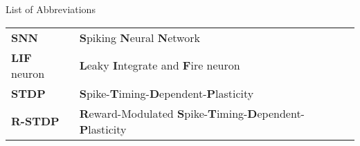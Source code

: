 \clearemptydoublepage

{}

\begin{center}
	\huge{List of Abbreviations}
\end{center}


\vspace{3cm}

\begin{center}
\begin{tabular}{l p{12cm}}
	\textbf{SNN} & \textbf{S}piking \textbf{N}eural \textbf{N}etwork\\
	\textbf{LIF} neuron & \textbf{L}eaky \textbf{I}ntegrate and \textbf{F}ire neuron\\
	\textbf{STDP} & \textbf{S}pike-\textbf{T}iming-\textbf{D}ependent-\textbf{P}lasticity\\
	\textbf{R-STDP} &  \textbf{R}eward-Modulated \textbf{S}pike-\textbf{T}iming-\textbf{D}ependent-\textbf{P}lasticity\\
\end{tabular}
\end{center}
